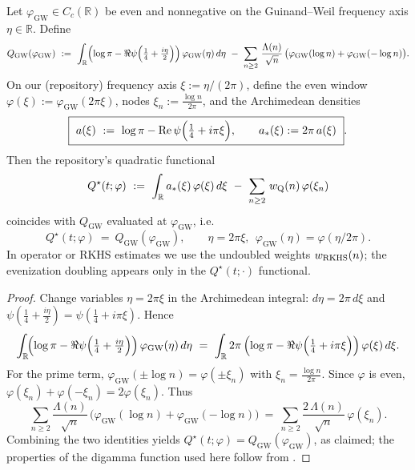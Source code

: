 \begin{lemma}\label{t0:lem:T0}
Let $\varphi_{\mathrm{GW}}\in C_c(\mathbb R)$ be even and nonnegative on the Guinand--Weil frequency axis $\eta\in\mathbb R$. Define
\begin{equation}\label{eq:T0_Q_normalization-formula}
Q_{\mathrm{GW}}(\varphi_{\mathrm{GW}})
\ :=\ \int_{\mathbb R} \Bigl(\log\pi-\Re\psi\Big(\tfrac14+\tfrac{i\eta}{2}\Big)\Bigr)\,\varphi_{\mathrm{GW}}(\eta)\,d\eta
\ -\ \sum_{n\ge2}\,\frac{\Lambda(n)}{\sqrt n}\,\bigl(\varphi_{\mathrm{GW}}(\log n)+\varphi_{\mathrm{GW}}(-\log n)\bigr).
\end{equation}
On our (repository) frequency axis $\xi:=\eta/(2\pi)$, define the even window $\varphi(\xi):=\varphi_{\mathrm{GW}}(2\pi\xi)$, nodes $\xi_n:=\frac{\log n}{2\pi}$, and the Archimedean densities
\begin{equation}\label{eq:T0_Q_normalization-formula-3}
\boxed{\ \aarch(\xi)\ :=\ \log\pi-\mathrm{Re}\,\psi\Big(\tfrac14+i\pi\xi\Big),\qquad \astar(\xi):=2\pi\,\aarch(\xi)\ }.
\end{equation}
Then the repository's quadratic functional
\begin{equation}\label{eq:T0_Q_normalization-q-functional-2}
Q^\star(t;\varphi)\ :=\ \int_{\mathbb R} \astar(\xi)\,\varphi(\xi)\,d\xi\ -\ \sum_{n\ge2}\,\wQ{n}\,\varphi(\xilog)
\end{equation}
coincides with $Q_{\mathrm{GW}}$ evaluated at $\varphi_{\mathrm{GW}}$, i.e.
\begin{equation}\label{eq:T0_Q_normalization-q-functional-1}
Q^\star(t;\varphi)\ =\ Q_{\mathrm{GW}}(\varphi_{\mathrm{GW}}),\qquad \eta=2\pi\xi,\ \ \varphi_{\mathrm{GW}}(\eta)=\varphi(\eta/2\pi).
\end{equation}
In operator or RKHS estimates we use the undoubled weights \(w_{\mathrm{RKHS}}(n)\); the evenization doubling appears only in the $Q^\star(t;\cdot)$ functional.\par
\end{lemma}
\begin{proof}
Change variables $\eta=2\pi\xi$ in the Archimedean integral: $d\eta=2\pi\,d\xi$ and $\psi(\tfrac14+\tfrac{i\eta}{2})=\psi(\tfrac14+i\pi\xi)$. Hence
\begin{equation}\label{eq:T0_Q_normalization-formula-2}
\int_{\mathbb R}\!\Bigl(\log\pi-\Re\psi\Big(\tfrac14+\tfrac{i\eta}{2}\Big)\Bigr)\,\varphi_{\mathrm{GW}}(\eta)\,d\eta
\ =\ \int_{\mathbb R} 2\pi\,\Bigl(\log\pi-\Re\psi\Big(\tfrac14+i\pi\xi\Big)\Bigr)\,\varphi(\xi)\,d\xi.
\end{equation}
For the prime term, $\varphi_{\mathrm{GW}}(\pm\log n)=\varphi(\pm\xi_n)$ with $\xi_n=\tfrac{\log n}{2\pi}$. Since $\varphi$ is even, $\varphi(\xi_n)+\varphi(-\xi_n)=2\varphi(\xi_n)$. Thus
\begin{equation}\label{eq:T0_Q_normalization-formula-1}
\sum_{n\ge2}\frac{\Lambda(n)}{\sqrt n}\,\bigl(\varphi_{\mathrm{GW}}(\log n)+\varphi_{\mathrm{GW}}(-\log n)\bigr)
\ =\ \sum_{n\ge2}\frac{2\,\Lambda(n)}{\sqrt n}\,\varphi(\xi_n).
\end{equation}
Combining the two identities yields $Q^\star(t;\varphi)=Q_{\mathrm{GW}}(\varphi_{\mathrm{GW}})$, as claimed; the properties of the digamma function used here follow from \cite[§5.2]{NISTDLMF}.
\end{proof}
